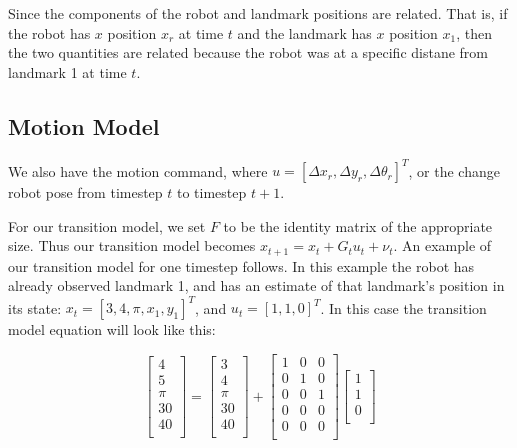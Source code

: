 \documentclass[prodmode,acmtecs]{acmsmall} %
\begin{document}
Since the components of the robot and landmark positions are related. That is, if the robot has $x$ position $x_r$ at time $t$ and the landmark has $x$ position $x_1$, then the two quantities are related because the robot was at a specific distane from landmark 1 at time $t$.

\subsection{Motion Model}

We also have the motion command, where $u=[\Delta x_r, \Delta y_r, \Delta \theta_r]^T$, or the change robot pose from timestep $t$ to timestep $t+1$.

For our transition model, we set $F$ to be the identity matrix of the appropriate size. Thus our transition model becomes $x_{t+1} = x_t + G_tu_t + \nu_t$. An example of our transition model for one timestep follows. In this example the robot has already observed landmark 1, and has an estimate of that landmark's position in its state: $x_t=[3, 4, \pi, x_1, y_1]^T$, and $u_t = [1,1,0]^T$. In this case the transition model equation will look like this:

$$
\begin{bmatrix}
    4  \\
    5  \\
    \pi\\
    30 \\
    40 \\
\end{bmatrix}
=
\begin{bmatrix}
    3  \\
    4  \\
    \pi\\
    30 \\
    40 \\
\end{bmatrix}
+
\begin{bmatrix}
    1 & 0 & 0  \\
    0 & 1 & 0  \\
    0 & 0 & 1  \\
    0 & 0 & 0  \\
    0 & 0 & 0  \\
\end{bmatrix}
\begin{bmatrix}
    1 \\
    1 \\
    0 \\
\end{bmatrix}
$$
\end{document}
